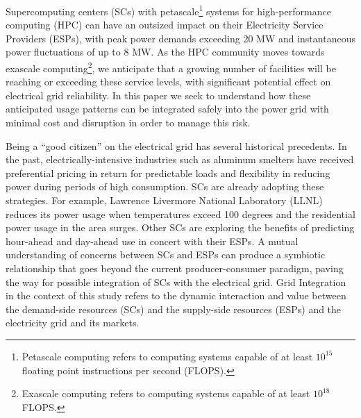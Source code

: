 Supercomputing centers (SCs) with petascale\footnote{Petascale computing refers to computing systems capable of at
least \(10^{15}\) floating point instructions per second (FLOPS).} 
systems for high-performance computing (HPC) can have an outsized 
impact on their Electricity Service Providers (ESPs), with peak 
power demands %
exceeding 20 MW and instantaneous power fluctuations of up to 8 MW. 
As the HPC community moves towards exascale computing\footnote{Exascale computing refers to computing systems capable of at
least \(10^{18}\)FLOPS.}, we anticipate that a growing number of facilities will
be reaching or exceeding these service levels, with significant potential 
effect on electrical grid reliability.
In this paper we seek to understand how these anticipated
usage patterns can be integrated safely into the power grid with minimal cost 
and disruption in order to manage
this risk.

Being a ``good citizen'' on the electrical grid has several historical precedents.
In the past, electrically-intensive industries such as aluminum smelters 
have received preferential pricing in return for predictable loads and
flexibility in reducing power during periods of high consumption.
SCs are already adopting these strategies.  
For example, Lawrence Livermore National Laboratory (LLNL)
reduces its power usage when temperatures exceed 
100 degrees and the residential power usage in the area surges.
Other %
SCs are exploring the benefits of predicting hour-ahead and 
day-ahead use in concert with their %
ESPs.
A mutual understanding of concerns between SCs and ESPs can 
produce a symbiotic relationship that goes beyond the current producer-consumer 
paradigm, paving the way for possible integration of %
SCs with the electrical grid. Grid Integration in the context of this study refers to the dynamic interaction and value between the demand-side resources (SCs) and the supply-side resources (ESPs) and the electricity grid and its markets.

